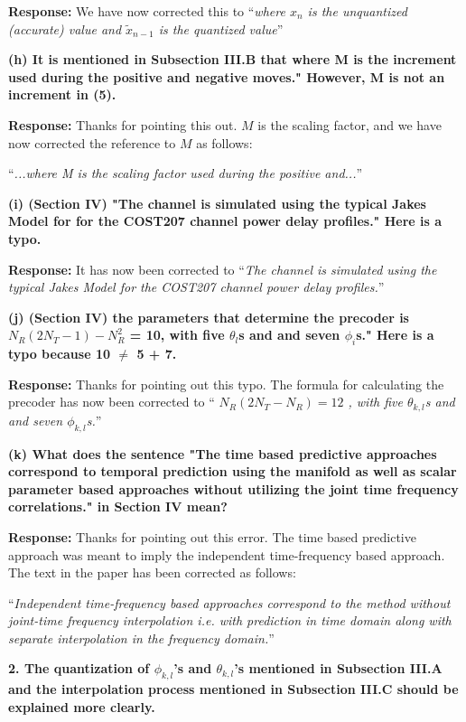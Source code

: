 \documentclass[12pt]{letter}
\begin{document}
\textbf{Response:} We have now corrected this to ``\emph{where $x_n$ is
  the unquantized (accurate) value and $\tilde{x}_{n-1}$ is the
  quantized value}''

\textbf{(h) It is mentioned in Subsection III.B that where M is the increment used during the positive and negative moves." However, M is not an increment in (5).}

\textbf{Response:} Thanks for pointing this out. $M$ is the scaling
factor, and we have now corrected the reference to $M$ as follows:

``\emph{...where M is the scaling factor used during the positive and...}''


\textbf{(i) (Section IV) "The channel is simulated using the typical Jakes Model for for the COST207 channel power delay profiles." Here is a typo.}

\textbf{Response:} It has now been corrected to ``\emph{The channel is simulated using the typical Jakes Model for the COST207 channel power delay profiles.}''

\textbf{(j) (Section IV) the parameters that determine the precoder is $N_R (2N_T - 1) - N^{2}_R$ = 10, with five $\theta_l$s and and seven $\phi_i$s." Here is a typo because 10 $\neq$ 5 + 7.}

\textbf{Response:} Thanks for pointing out this typo. The formula for
calculating the precoder has now been corrected to ``\emph{
  $N_{R}(2N_{T} - N_R) = 12$ , with five $\theta_{k,l}$s and and seven
  $\phi_{k,l}$s.}''

\textbf{(k) What does the sentence "The time based predictive approaches correspond to temporal prediction using the manifold as well as scalar parameter based approaches without utilizing the joint time frequency correlations." in Section IV mean?}

\textbf{Response:} Thanks for pointing out this error. The time based
predictive approach was meant to imply the independent time-frequency based
approach. The text in the paper has been corrected as follows:


``\emph{Independent time-frequency based approaches correspond to the
  method without joint-time frequency interpolation i.e. with
  prediction in time domain along with separate interpolation in the frequency
  domain.}''

\textbf{2. The quantization of $\phi_{k,l}$'s and $\theta_{k,l}$'s mentioned in Subsection III.A and the interpolation
process mentioned in Subsection III.C should be explained more clearly.}
\end{document}
